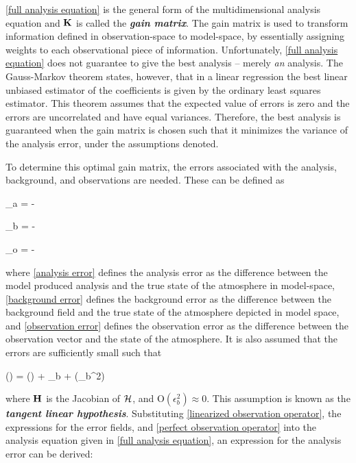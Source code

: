 \ref{full analysis equation} is the general form of the multidimensional analysis equation and $\mathbf{K}$ is called the \emph{\textbf{gain matrix}}. The gain matrix is used to transform information defined in observation-space to model-space, by essentially assigning weights to each observational piece of information. Unfortunately, \ref{full analysis equation} does not guarantee to give the best analysis -- merely \emph{an} analysis. The Gauss-Markov theorem states, however, that in a linear regression the best linear unbiased estimator of the coefficients is given by the ordinary least squares estimator. This theorem assumes that the expected value of errors is zero and the errors are uncorrelated and have equal variances. Therefore, the best analysis is guaranteed when the gain matrix is chosen such that it minimizes the variance of the analysis error, under the assumptions denoted.


To determine this optimal gain matrix, the errors associated with the analysis, background, and observations are needed. These can be defined as


\be
    \label{analysis error}
    \epsilon_a =  - 
\ee


\be
    \label{background error}
    \epsilon_b =  - 
\ee


\be
    \label{observation error}
    \epsilon_o =  - 
\ee


\noindent where \ref{analysis error} defines the analysis error as the difference between the model produced analysis and the true state of the atmosphere in model-space, \ref{background error} defines the background error as the difference between the background field and the true state of the atmosphere depicted in model space, and \ref{observation error} defines the observation error as the difference between the observation vector and the state of the atmosphere. It is also assumed that the errors are sufficiently small such that


\be
    \label{linearized observation operator}
    () = () + \epsilon_b + (\epsilon_b^2)
\ee


\noindent where $\mathbf{H}$ is the Jacobian of $\mathcal{H}$, and O$(\epsilon_b^2) \approx 0$. This assumption is known as the \emph{\textbf{tangent linear hypothesis}}. Substituting \ref{linearized observation operator}, the expressions for the error fields, and \ref{perfect observation operator} into the analysis equation given in \ref{full analysis equation}, an expression for the analysis error can be derived:


